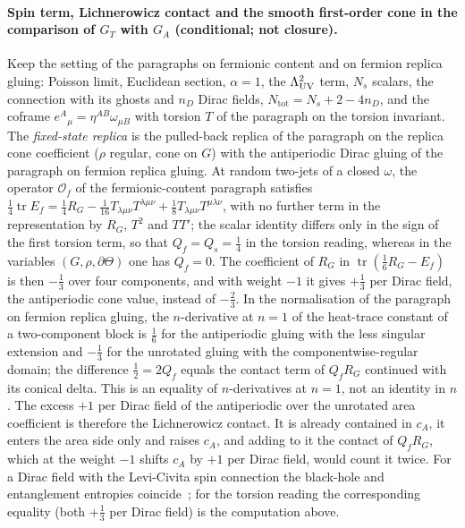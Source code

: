 \paragraph{Spin term, Lichnerowicz contact and the smooth first-order cone in the comparison of \(G_T\) with \(G_A\) (conditional; not closure).}
Keep the setting of the paragraphs on fermionic content and on fermion replica gluing: Poisson limit, Euclidean section, \(\alpha=1\), the \(\Lambda_{\mathrm{UV}}^2\) term, \(N_s\) scalars, the connection with its ghosts and \(n_D\) Dirac fields, \(N_{\mathrm{tot}}=N_s+2-4n_D\), and the coframe \(e^A{}_\mu=\eta^{AB}\omega_{\mu B}\) with torsion \(T\) of the paragraph on the torsion invariant. The \emph{fixed-state replica} is the pulled-back replica of the paragraph on the replica cone coefficient (\(\rho\) regular, cone on \(G\)) with the antiperiodic Dirac gluing of the paragraph on fermion replica gluing. At random two-jets of a closed \(\omega\), the operator \(\mathcal O_f\) of the fermionic-content paragraph satisfies \(\tfrac14\operatorname{tr}E_f=\tfrac14R_G-\tfrac1{16}T_{\lambda\mu\nu}T^{\lambda\mu\nu}+\tfrac18T_{\lambda\mu\nu}T^{\mu\lambda\nu}\), with no further term in the representation by \(R_G\), \(T^2\) and \(TT'\); the scalar identity differs only in the sign of the first torsion term, so that \(Q_f=Q_s=\tfrac14\) in the torsion reading, whereas in the variables \((G,\rho,\partial\Theta)\) one has \(Q_f=0\). The coefficient of \(R_G\) in \(\operatorname{tr}(\tfrac16R_G-E_f)\) is then \(-\tfrac13\) over four components, and with weight \(-1\) it gives \(+\tfrac13\) per Dirac field, the antiperiodic cone value, instead of \(-\tfrac23\). In the normalisation of the paragraph on fermion replica gluing, the \(n\)-derivative at \(n=1\) of the heat-trace constant of a two-component block is \(\tfrac16\) for the antiperiodic gluing with the less singular extension and \(-\tfrac13\) for the unrotated gluing with the componentwise-regular domain; the difference \(\tfrac12=2Q_f\) equals the contact term of \(Q_fR_G\) continued with its conical delta. This is an equality of \(n\)-derivatives at \(n=1\), not an identity in \(n\). The excess \(+1\) per Dirac field of the antiperiodic over the unrotated area coefficient is therefore the Lichnerowicz contact. It is already contained in \(c_A\), it enters the area side only and raises \(c_A\), and adding to it the contact of \(Q_fR_G\), which at the weight \(-1\) shifts \(c_A\) by \(+1\) per Dirac field, would count it twice. For a Dirac field with the Levi-Civita spin connection the black-hole and entanglement entropies coincide~\cite{Kabat1995}; for the torsion reading the corresponding equality (both \(+\tfrac13\) per Dirac field) is the computation above.

